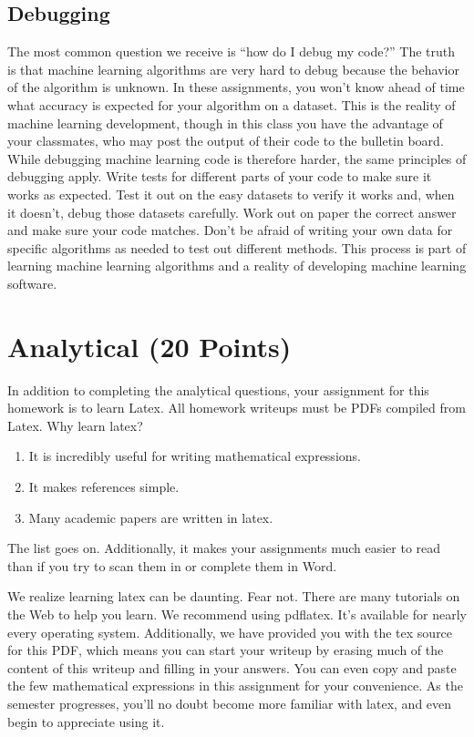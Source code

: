 \documentclass[11pt]{article}
\begin{document}
	\subsection{Debugging}
	The most common question we receive is ``how do I debug my code?'' The truth is that machine learning algorithms are very hard to debug because
	the behavior of the algorithm is unknown. In these assignments, you won't know ahead of time what accuracy is expected for your algorithm on a dataset.
	This is the reality of machine learning development, though in this class you have the advantage of your classmates, who may post the output of their code to the
	bulletin board. While debugging machine learning code is therefore harder, the same principles of debugging apply. Write tests for different parts of your code
	to make sure it works as expected. Test it out on the easy datasets to verify it works and, when it doesn't, debug those datasets carefully. Work out on paper
	the correct answer and make sure your code matches. Don't be afraid of writing your own data for specific algorithms as needed to test out different methods.
	This process is part of learning machine learning algorithms and a reality of developing machine learning software.
	
	\section{Analytical (20 Points)}
	In addition to completing the analytical questions, your assignment for this homework is to learn Latex. All homework writeups must be PDFs compiled from Latex. Why learn latex?
	\begin{enumerate}
		\item It is incredibly useful for writing mathematical expressions.
		\item It makes references simple.
		\item Many academic papers are written in latex.
	\end{enumerate}
	The list goes on. Additionally, it makes your assignments much easier to read than if you try to scan them in or complete them in Word.
	
	We realize learning latex can be daunting. Fear not. There are many tutorials on the Web to help you learn. We recommend using pdflatex. It's available for nearly every operating system. Additionally, we have provided you with the tex source for this PDF, which means you can start your writeup by erasing much of the content of this writeup and filling in your answers. You can even copy and paste the few mathematical expressions in this assignment for your convenience. As the semester progresses, you'll no doubt become more familiar with latex, and even begin to appreciate using it.
	
\end{document}
